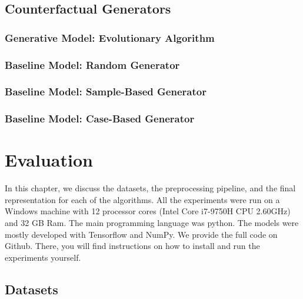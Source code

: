 \documentclass[12pt,a4paper]{report}
\begin{document}
\section{Counterfactual Generators}
\label{sec:model_generation}
\subsection{Generative Model: Evolutionary Algorithm}
\label{sec:model_evolutionary}


\subsection{Baseline Model: Random Generator}


\subsection{Baseline Model: Sample-Based Generator}


\subsection{Baseline Model: Case-Based Generator}



\chapter{Evaluation}
\label{ch:evaluation}
In this chapter, we discuss the datasets, the preprocessing pipeline, and the final representation for each of the algorithms. All the experiments were run on a Windows machine with 12 processor cores (Intel Core i7-9750H CPU 2.60GHz) and 32 GB Ram. The main programming language was python. 
The models were mostly developed with Tensorflow\autocite{abadi2016tensorflow} and NumPy\autocite{2020NumPy-Array}. 
We provide the full code on Github\autocite{hundogan_ThesisProjectCode_2022}. 
There, you will find instructions on how to install and run the experiments yourself.


\section{Datasets}
\label{sec:dataset_description}


\end{document}
